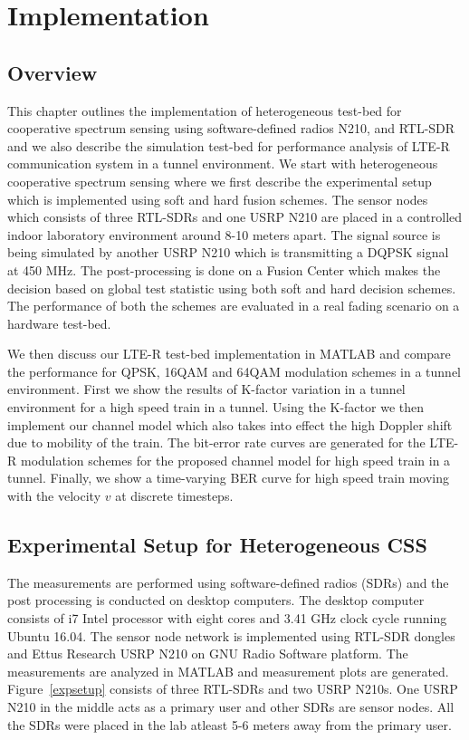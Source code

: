 \chapter{Implementation}
\label{chapter5}

\section{Overview}
This chapter outlines the implementation of heterogeneous test-bed for cooperative spectrum sensing using software-defined radios N210, and RTL-SDR and we also describe the simulation test-bed for performance analysis of LTE-R communication system in a tunnel environment. We start with heterogeneous cooperative spectrum sensing where we first describe the experimental setup which is implemented using soft and hard fusion schemes. The sensor nodes which consists of three RTL-SDRs and one USRP N210 are placed in a controlled indoor laboratory environment around 8-10 meters apart. The signal source is being simulated by another USRP N210 which is transmitting a DQPSK signal at 450 MHz. The post-processing is done on a Fusion Center which makes the decision based on global test statistic using both soft and hard decision schemes. The performance of both the schemes are evaluated in a real fading scenario on a hardware test-bed. 

We then discuss our LTE-R test-bed implementation in MATLAB and compare the performance for QPSK, 16QAM and 64QAM modulation schemes in a tunnel environment. First we show the results of K-factor variation in a tunnel environment for a high speed train in a tunnel. Using the K-factor we then implement our channel model which also takes into effect the high Doppler shift due to mobility of the train. The bit-error rate curves are generated for the LTE-R modulation schemes for the proposed channel model for high speed train in a tunnel. Finally, we show a time-varying BER curve for high speed train moving with the velocity $v$ at discrete timesteps.


\section{Experimental Setup for Heterogeneous CSS}

The measurements are performed using software-defined radios (SDRs) and the post processing is conducted on desktop computers. The desktop computer consists of i7 Intel processor with eight cores and 3.41 GHz clock cycle running Ubuntu 16.04. The sensor node network is implemented using RTL-SDR dongles and Ettus Research USRP N210 on GNU Radio Software platform. The measurements are analyzed in MATLAB and measurement plots are generated. Figure~\ref{expsetup} consists of three RTL-SDRs and two USRP N210s. One USRP N210 in the middle acts as a primary user and other SDRs are sensor nodes. All the SDRs were placed in the lab atleast 5-6  meters away from the primary user.

